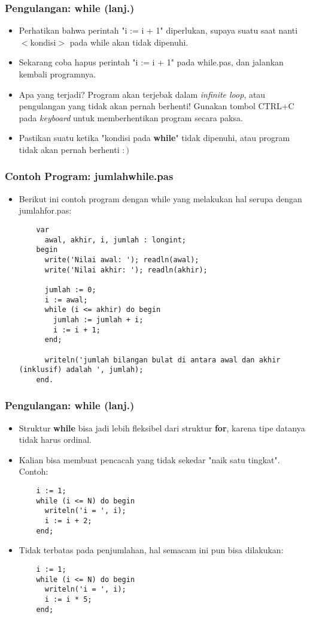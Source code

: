 \begin{frame}
\frametitle{Pengulangan: while (lanj.)}
\begin{itemize}
  \item Perhatikan bahwa perintah "i := i + 1" diperlukan, supaya suatu saat nanti $<$kondisi$>$ pada while akan tidak dipenuhi.
  \item Sekarang coba hapus perintah "i := i + 1" pada while.pas, dan jalankan kembali programnya.
  \item Apa yang terjadi? Program akan terjebak dalam \alert{\textit{infinite loop}}, atau \alert{pengulangan yang tidak akan pernah berhenti}! Gunakan tombol CTRL+C pada \textit{keyboard} untuk memberhentikan program secara paksa.
  \item Pastikan suatu ketika "kondisi pada \textbf{while}" tidak dipenuhi, atau program tidak akan pernah berhenti $:)$
\end{itemize}
\end{frame}

\begin{frame}[fragile]
\frametitle{Contoh Program: jumlahwhile.pas}
\begin{itemize}
  \item Berikut ini contoh program dengan while yang melakukan hal serupa dengan jumlahfor.pas:
  \begin{lstlisting}
    var
      awal, akhir, i, jumlah : longint;
    begin
      write('Nilai awal: '); readln(awal);
      write('Nilai akhir: '); readln(akhir);

      jumlah := 0;
      i := awal;
      while (i <= akhir) do begin
        jumlah := jumlah + i;
        i := i + 1;
      end;

      writeln('jumlah bilangan bulat di antara awal dan akhir (inklusif) adalah ', jumlah);
    end.
  \end{lstlisting}
\end{itemize}
\end{frame}

\begin{frame}[fragile]
\frametitle{Pengulangan: while (lanj.)}
\begin{itemize}
  \item Struktur \textbf{while} bisa jadi lebih fleksibel dari struktur \textbf{for}, karena tipe datanya tidak harus ordinal.
  \item Kalian bisa membuat pencacah yang tidak sekedar "naik satu tingkat". Contoh:
  \begin{lstlisting}
    i := 1;
    while (i <= N) do begin
      writeln('i = ', i);
      i := i + 2;
    end;
  \end{lstlisting}

  \item Tidak terbatas pada penjumlahan, hal semacam ini pun bisa dilakukan:
  \begin{lstlisting}
    i := 1;
    while (i <= N) do begin
      writeln('i = ', i);
      i := i * 5;
    end;
  \end{lstlisting}
\end{itemize}
\end{frame}


